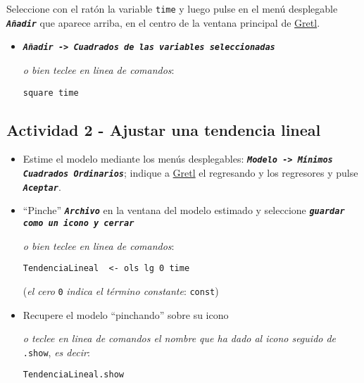 \documentclass[11pt]{article}
\begin{document}
Seleccione con el ratón la variable \texttt{time} y luego pulse en el menú desplegable \textbf{\emph{\texttt{Añadir}}} que aparece arriba, en el centro de la
ventana principal de \href{https://gretl.sourceforge.net/es.html}{Gretl}.
\begin{itemize}
\item \textbf{\emph{\texttt{Añadir -> Cuadrados de las variables seleccionadas}}}

{\vspace{0pt} \footnotesize \color{gray!70!black}
\emph{o bien teclee en linea de comandos}: 
\begin{verbatim}
square time
\end{verbatim}
}
\end{itemize}

\vspace{-3pt}

\subsection{Actividad 2 - Ajustar una tendencia lineal}
\label{sec:orga5aaf26}
\begin{itemize}
\item Estime el modelo mediante los menús desplegables: \textbf{\emph{\texttt{Modelo ->
  Mínimos Cuadrados Ordinarios}}}; indique a \href{https://gretl.sourceforge.net/es.html}{Gretl} el regresando y los
regresores y pulse \textbf{\emph{\texttt{Aceptar}}}.

\item ``Pinche'' \textbf{\emph{\texttt{Archivo}}} en la ventana del modelo estimado y
seleccione \textbf{\emph{\texttt{guardar como un icono y cerrar}}}

{\vspace{1pt} \footnotesize \color{gray!70!black} \color{gray!70!black}
\emph{o bien teclee en linea de comandos}:
\begin{verbatim}
TendenciaLineal  <- ols lg 0 time
\end{verbatim}
(\emph{el cero} \texttt{0} \emph{indica el término constante}: \texttt{const})
}

\item Recupere el modelo ``pinchando'' sobre su icono

{\vspace{1pt} \footnotesize \color{gray!70!black} \color{gray!70!black}
\emph{o teclee en linea de comandos el nombre que ha dado al icono
seguido de} \texttt{.show}, \emph{es decir}:
\begin{verbatim}
TendenciaLineal.show
\end{verbatim}
}
\end{itemize}
\end{document}
